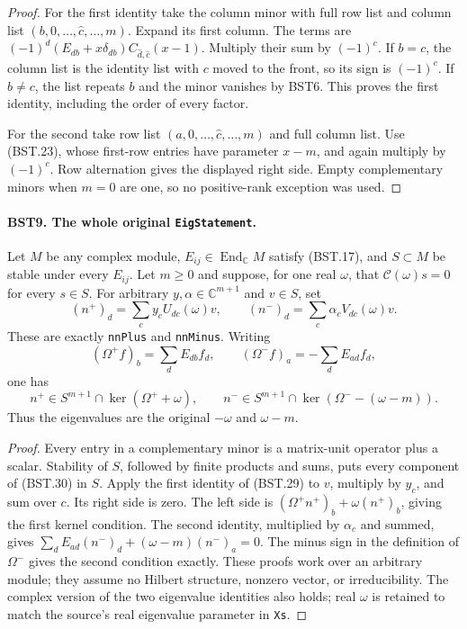 \documentclass[11pt,a4paper]{article}
\numberwithin{equation}{section}
\theoremstyle{remark}\newtheorem{remark}[theorem]{Remark}
\begin{document}
\begin{proof}
For the first identity take the column minor with full row list and
column list $(b,0,\ldots,\widehat c,\ldots,m)$.
Expand its first column.  The terms are
$(-1)^d(E_{db}+x\delta_{db})
C_{\widehat d,\widehat c}(x-1)$.
Multiply their sum by $(-1)^c$.  If $b=c$, the column list is
the identity list with $c$ moved to the front, so its sign is
$(-1)^c$.  If $b\ne c$, the list repeats $b$ and the minor
vanishes by BST6.  This proves the first identity, including the
order of every factor.

For the second take row list $(a,0,\ldots,\widehat c,\ldots,m)$
and full column list.  Use (BST.23), whose first-row entries
have parameter $x-m$, and again multiply by $(-1)^c$.
Row alternation gives the displayed right side.  Empty complementary
minors when $m=0$ are one, so no positive-rank exception was used.
\end{proof}

\paragraph{BST9. The whole original \texttt{Eig\allowbreak Statement}.}
\label{claim:BST9}
Let $M$ be any complex module, $E_{ij}\in\operatorname{End}_{\mathbb C}M$
satisfy (BST.17), and $S\subset M$ be stable under every $E_{ij}$.
Let $m\ge0$ and suppose, for one real $\omega$, that
$\mathcal C(\omega)s=0$ for every $s\in S$.
For arbitrary $y,\alpha\in\mathbb C^{m+1}$ and $v\in S$, set
\[
 (n^+)_d=\sum_c y_cU_{dc}(\omega)v,\qquad
 (n^-)_d=\sum_c \alpha_cV_{dc}(\omega)v.
 \tag{BST.30}
\]
These are exactly \texttt{nn\allowbreak Plus} and \texttt{nn\allowbreak Minus}.
Writing
\[
 (\Omega^+f)_b=\sum_d E_{db}f_d,\qquad
 (\Omega^-f)_a=-\sum_d E_{ad}f_d,
 \tag{BST.31}
\]
one has
\[
 n^+\in S^{m+1}\cap\ker(\Omega^++\omega),\qquad
 n^-\in S^{m+1}\cap\ker(\Omega^--(\omega-m)).
 \tag{BST.32}
\]
Thus the eigenvalues are the original $-\omega$ and $\omega-m$.

\begin{proof}
Every entry in a complementary minor is a matrix-unit operator plus
a scalar.  Stability of $S$, followed by finite products and sums,
puts every component of (BST.30) in $S$.
Apply the first identity of (BST.29) to $v$, multiply by $y_c$,
and sum over $c$.  Its right side is zero.  The left side is
$(\Omega^+n^+)_b+\omega(n^+)_b$, giving the first kernel condition.
The second identity, multiplied by $\alpha_c$ and summed, gives
$\sum_dE_{ad}(n^-)_d+(\omega-m)(n^-)_a=0$.
The minus sign in the definition of $\Omega^-$ gives the second
condition exactly.  These proofs work over an arbitrary module;
they assume no Hilbert structure, nonzero vector, or irreducibility.
The complex version of the two eigenvalue identities also holds;
real $\omega$ is retained to match the source's real eigenvalue
parameter in \texttt{Xs}.
\end{proof}
\end{document}
